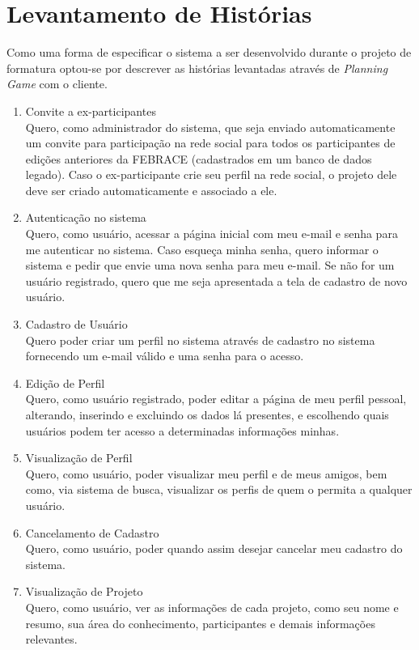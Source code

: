 \documentclass[a4paper,12pt,font=plain,header=plain]{abnt}
\begin{document}
  	\chapter{Levantamento de Histórias}

	Como uma forma de especificar o sistema a ser desenvolvido durante o projeto de formatura optou-se por descrever as histórias levantadas através de \textit{Planning Game} com o cliente.

	\begin{enumerate}
	 \item Convite a ex-participantes \\
		Quero, como administrador do sistema, que seja enviado automaticamente um convite para participação na rede social para todos os participantes de edições anteriores da FEBRACE (cadastrados em um banco de dados legado). Caso o ex-participante crie seu perfil na rede social, o projeto dele deve ser criado automaticamente e associado a ele.
	 \item Autenticação no sistema \\
		Quero, como usuário, acessar a página inicial com meu e-mail e senha para me autenticar no sistema. Caso esqueça minha senha, quero informar o sistema e pedir que envie uma nova senha para meu e-mail. Se não for um usuário registrado, quero que me seja apresentada a tela de cadastro de novo usuário.
	 \item Cadastro de Usuário \\
		Quero poder criar um perfil no sistema através de cadastro no sistema fornecendo um e-mail válido e uma senha para o acesso.
	 \item Edição de Perfil \\
		Quero, como usuário registrado, poder editar a página de meu perfil pessoal, alterando, inserindo e excluindo os dados lá presentes, e escolhendo quais usuários podem ter acesso a determinadas informações minhas.
	 \item Visualização de Perfil \\
		Quero, como usuário, poder visualizar meu perfil e de meus amigos, bem como, via sistema de busca, visualizar os perfis de quem o permita a qualquer usuário.
	 \item Cancelamento de Cadastro \\
		Quero, como usuário, poder quando assim desejar cancelar meu cadastro do sistema.
	 \item Visualização de Projeto \\
		Quero, como usuário, ver as informações de cada projeto, como seu nome e resumo, sua área do conhecimento, participantes e demais informações relevantes.

\end{enumerate}
\end{document}
